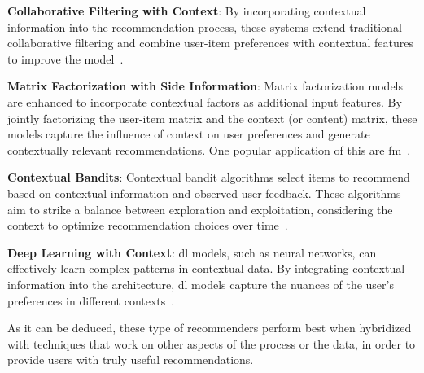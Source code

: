 \begin{compactitem}[\textbullet]
    \item \textbf{Collaborative Filtering with Context}: By incorporating contextual information into the recommendation process, these systems extend traditional collaborative filtering and combine user-item preferences with contextual features to improve the model~\cite[Classical Approaches]{CHAPTER:RS-HANDBOOK-CONTEXT}.
    \item \textbf{Matrix Factorization with Side Information}: Matrix factorization models are enhanced to incorporate contextual factors as additional input features. By jointly factorizing the user-item matrix and the context (or content) matrix, these models capture the influence of context on user preferences and generate contextually relevant recommendations. One popular application of this are \ac{fm}~\cite[Classical Approaches, Tensor Factorization]{CHAPTER:RS-HANDBOOK-CONTEXT}.
    \item \textbf{Contextual Bandits}: Contextual bandit algorithms select items to recommend based on contextual information and observed user feedback. These algorithms aim to strike a balance between exploration and exploitation, considering the context to optimize recommendation choices over time~\cite[Reinforcement Learning]{CHAPTER:RS-HANDBOOK-CONTEXT}.
    \item \textbf{Deep Learning with Context}: \ac{dl} models, such as neural networks, can effectively learn complex patterns in contextual data. By integrating contextual information into the architecture, \acs{dl} models capture the nuances of the user's preferences in different contexts~\cite[Deep Learning]{CHAPTER:RS-HANDBOOK-CONTEXT}.
\end{compactitem}

As it can be deduced, these type of recommenders perform best when hybridized with techniques that work on other aspects of the process or the data, in order to provide users with truly useful recommendations.